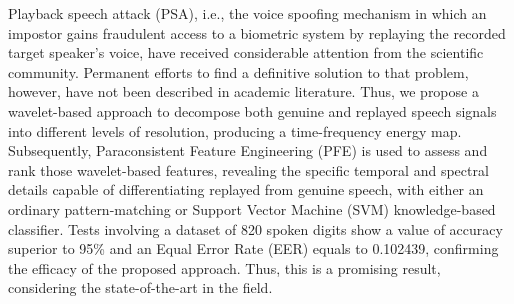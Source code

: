 \par Playback speech attack (PSA), i.e., the voice spoofing mechanism in which an impostor gains fraudulent access to a biometric system by replaying the recorded target speaker's voice, have received considerable attention from the scientific community. Permanent efforts to find a definitive solution to that problem, however, have not been described in academic literature. Thus, we propose a wavelet-based approach to decompose both genuine and replayed speech signals into different levels of resolution, producing a time-frequency energy map. Subsequently, Paraconsistent Feature Engineering (PFE) is used to assess and rank those wavelet-based features, revealing the specific temporal and spectral details capable of differentiating replayed from genuine speech, with either an ordinary pattern-matching or Support Vector Machine (SVM) knowledge-based classifier. Tests involving a dataset of 820 spoken digits show a value of accuracy superior to 95\% and an Equal Error Rate (EER) equals to 0.102439, confirming the efficacy of the proposed approach. Thus, this is a promising result, considering the state-of-the-art in the field.